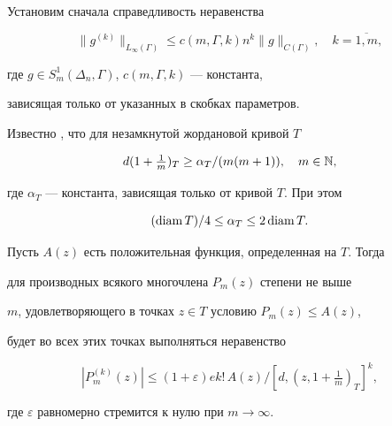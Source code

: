 \begin{pf}


Установим сначала справедливость неравенства


\begin{equation}


\|g^{(k)}\|_{L_\infty(\Gamma)}\le c(m,\Gamma,k)n^k\|g\|_{C(\Gamma)},


\quad k=\overline{1,m},


\end{equation}


где $g\in S^1_m(\Delta_n,\Gamma)$, $c(m,\Gamma,k)$ --- константа,


зависящая только от указанных в скобках параметров.





Известно \cite{7}, что для незамкнутой жордановой кривой $T$


\begin{equation}


d(1+\tfrac{1}{m})_T\ge \alpha_T/(m(m+1)),\quad m\in\Bbb N,


\end{equation}


где $\alpha_T$ --- константа, зависящая только от кривой $T$. При этом


\cite{8}


\begin{equation}


(\diam T)/4\le\alpha_T\le 2\diam T.


\end{equation}





Пусть $A(z)$ есть положительная функция, определенная на $T$. Тогда


\cite{9} для производных всякого многочлена $P_m(z)$ степени не выше


$m$, удовлетворяющего в точках $z\in T$ условию $P_m(z)\le A(z)$,


будет во всех этих точках выполняться неравенство


\begin{equation}


|P^{(k)}_m(z)|\le (1+\varepsilon)ek!\,A(z)/[d,(z,1+\tfrac{1}{m})_T]^k,


\end{equation}


где $\varepsilon$ равномерно стремится к нулю при $m\to\infty$.






\end{pf}

